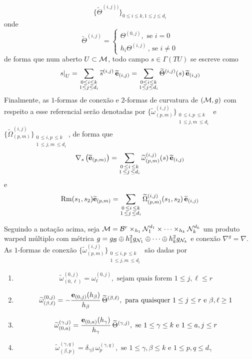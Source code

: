 \[
\{\widetilde{\Theta}^{(i, j))} \}_{0 \leq i \leq k, 1 \leq j \leq d_i}
\]
onde
\[
\widetilde{\Theta}^{(i, j)} = \begin{cases}
\Theta^{(0, j)}, \text{ se } i = 0 \\
h_i \Theta^{(i, j)} \, \text{, se } i \neq 0
\end{cases}
\]
de forma que num aberto $U \subset \mathcal{M}$, todo campo $s \in \Gamma(T U)$ se escreve como
\[
\left.s\right|_{U} = \sum_{\substack{0 \leq i \leq k\\
1 \leq j \leq d_i 
}} \widetilde{s}^{(i, j)} \, \widetilde{\mathbf{e}}_{(i, j)} =  \sum_{\substack{0 \leq i \leq k\\
1 \leq j \leq d_i 
}} \widetilde{\Theta}^{(i, j)}(s) \, \widetilde{\mathbf{e}}_{(i, j)}
\]
Finalmente, as $1$-formas de conexão e $2$-formas de curvatura de $(\mathcal{M}, g)$ com respeito a esse referencial serão denotadas por $ \{ \widetilde{\omega}^{(i, j)}_{(p, m)} \}_{\substack{0 \, \leq i, p \, \leq k\\
1 \, \leq j, m \, \leq d_i 
}}$ e $ \{ \widetilde{\Omega}^{(i, j)}_{(p, m)} \}_{\substack{0 \, \leq i, p \, \leq k\\
1 \, \leq j, m \, \leq d_i 
}}$, de forma que
\[
\nabla_s \left( \widetilde{\mathbf{e}}_{(p, m)} \right) = \sum_{\substack{0 \, \leq i \, \leq k\\
1 \, \leq j \, \leq d_i  
}} \widetilde{\omega}^{(i, j)}_{(p, m)}(s) \, \widetilde{\mathbf{e}}_{(i, j)}
\] e
\[
\mathrm{Rm}(s_1, s_2) \widetilde{\mathbf{e}}_{(p, m)}= \sum_{\substack{0 \, \leq i \, \leq k\\
1 \, \leq j \, \leq d_i  
}} \widetilde{\Omega}^{(i, j)}_{(p, m)}(s_1, s_2) \, \widetilde{\mathbf{e}}_{(i, j)}
\] 
\begin{lema}\label{MovelWarped}
Seguindo a notação acima, seja $\mathcal{M} = \mathcal{B}^r \times_{h_1} \mathcal{N}_1^{d_1} \times \cdots \times_{h_k} \mathcal{N}_{k}^{d_k}$ um produto warped múltiplo com métrica $g = g_{\mathcal{B}} \oplus h_1^2 g_{\mathcal{N}_1} \oplus \cdots \oplus h_{k}^2 g_{\mathcal{N}_k}$ e conexão $\nabla^g = \nabla$. As $1$-formas de conexão $ \{ \widetilde{\omega}^{(i, j)}_{(p, m)} \}_{\substack{0 \, \leq i, p \, \leq k\\
1 \, \leq j, m \, \leq d_i 
}}$
são dadas por 
\begin{enumerate}[label=\color{blue}\normalfont\textbf{(\alph*)}]
\item\label{letraA118} \[
\widetilde{\omega}^{(0, j)}_{(0, \ell)} = \omega^{(0, j)}_{\ell}, \text{ sejam quais forem $1 \leq j, \ell \leq r$}
\]
\item\label{letraB118} \[ 
\widetilde{\omega}^{(0, j)}_{(\beta, \ell)} = - \frac{\mathbf{e}_{(0, j)}(h_{\beta})}{h_{\beta}} \, \widetilde{\Theta}^{(\beta, \ell)}, \text{ para quaisquer $1 \leq j \leq r$ e $\beta, \ell \geq 1$}
\]
\item\label{letraC118} \[
\widetilde{\omega}^{(\gamma, j)}_{(0, a)} = \frac{ \mathbf{e}_{(0, a)}(h_{\gamma})}{h_{\gamma}} \, \widetilde{\Theta}^{(\gamma, j)}, \text{ se $1 \leq \gamma \leq k$ e $1 \leq a, j \leq r$}
\]
\item\label{letraD118}  \[
\widetilde{\omega}^{(\gamma, q)}_{(\beta, p)} = \delta_{\gamma \beta} \, \omega^{(\gamma, q)}_p, \text{ se $1 \leq \gamma, \beta \leq k$ e $1 \leq p, q \leq d_{\gamma}$ }
\]
\end{enumerate}
\end{lema}
